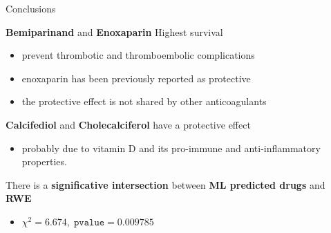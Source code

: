 \documentclass[compress,ignorenonframetext,aspectratio=1610,handout]{beamer}
\begin{document}
\begin{frame}{Conclusions}

	\textbf{Bemiparinand} and \textbf{Enoxaparin} \textrightarrow Highest survival
	\begin{itemize}
		\item prevent thrombotic and thromboembolic complications
		\item enoxaparin has been previously reported as protective
		\item the protective effect is not shared by other anticoagulants
	\end{itemize}

	\textbf{Calcifediol} and \textbf{Cholecalciferol} have a protective effect
	\begin{itemize}
		\item probably due to vitamin D and its pro-immune and anti-inflammatory properties.
	\end{itemize}

	There is a \textbf{significative intersection} between \textbf{ML predicted drugs} and \textbf{RWE}
	\begin{itemize}
		\item $\chi^{2} = 6.674, \; \mathtt{pvalue} = 0.009785$
	\end{itemize}

\end{frame}
\end{document}
